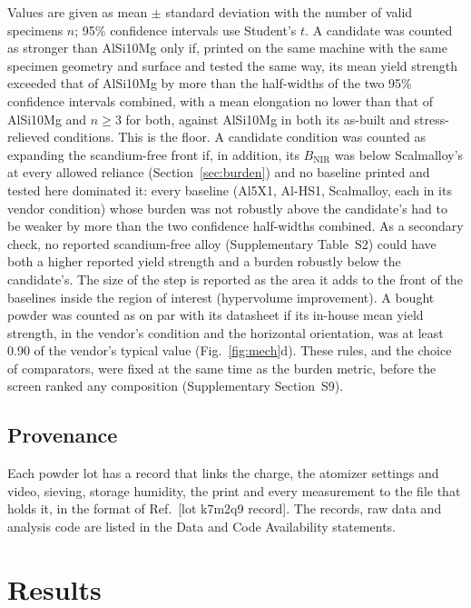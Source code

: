 \documentclass[preprint,12pt]{elsarticle}
\newcommand{\placeholder}[1]{\textcolor{red!75!black}{[#1]}}
\newcommand{\Scal}{Scalmalloy\xspace}
\newcommand{\AlSi}{AlSi10Mg\xspace}
\begin{document}
Values are given as mean $\pm$ standard deviation with the number of valid specimens $n$; 95\% confidence intervals use Student's $t$.
A candidate was counted as stronger than \AlSi only if, printed on the same machine with the same specimen geometry and surface and tested the same way, its mean yield strength exceeded that of \AlSi by more than the half-widths of the two 95\% confidence intervals combined, with a mean elongation no lower than that of \AlSi and $n \geq 3$ for both, against \AlSi in both its as-built and stress-relieved conditions.
This is the floor. A candidate condition was counted as expanding the scandium-free front if, in addition, its $B_\mathrm{NIR}$ was below \Scal's at every allowed reliance (Section~\ref{sec:burden}) and no baseline printed and tested here dominated it: every baseline (Al5X1, Al-HS1, \Scal, each in its vendor condition) whose burden was not robustly above the candidate's had to be weaker by more than the two confidence half-widths combined. As a secondary check, no reported scandium-free alloy (Supplementary Table~S2) could have both a higher reported yield strength and a burden robustly below the candidate's. The size of the step is reported as the area it adds to the front of the baselines inside the region of interest (hypervolume improvement).
A bought powder was counted as on par with its datasheet if its in-house mean yield strength, in the vendor's condition and the horizontal orientation, was at least 0.90 of the vendor's typical value (Fig.~\ref{fig:mech}d).
These rules, and the choice of comparators, were fixed at the same time as the burden metric, before the screen ranked any composition (Supplementary Section~S9).

\subsection{Provenance}

Each powder lot has a record that links the charge, the atomizer settings and video, sieving, storage humidity, the print and every measurement to the file that holds it, in the format of Ref.~\placeholder{lot k7m2q9 record}.
The records, raw data and analysis code are listed in the Data and Code Availability statements.

\section{Results}
\label{sec:results}
\end{document}
